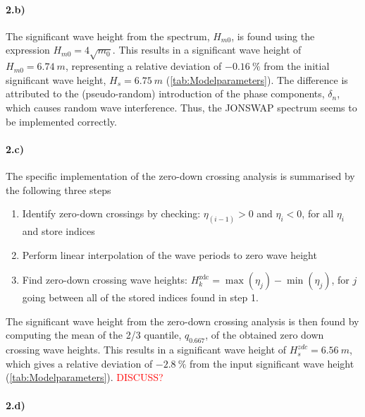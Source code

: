 \paragraph{2.b)} The significant wave height from the spectrum, $H_{m0}$, is found using the expression $H_{m0} = 4\sqrt{m_0}$. This results in a significant wave height of $H_{m0}=\SI{6.74}{m}$, representing a relative deviation of $\SI{-0.16}{\percent}$ from the initial significant wave height, $H_s=\SI{6.75}{m}$ (\cref{tab:Modelparameters}). The difference is attributed to the (pseudo-random) introduction of the phase components, $\delta_n$, which causes random wave interference. Thus, the JONSWAP spectrum seems to be implemented correctly. 

\paragraph{2.c)} The specific implementation of the zero-down crossing analysis is summarised by the following three steps
\begin{enumerate}
    \item Identify zero-down crossings by checking: $\eta_{(i-1)}> 0$ and $\eta_{i} < 0$, for all $\eta_i$ and store indices
    \item Perform linear interpolation of the wave periods to zero wave height
    \item Find zero-down crossing wave heights: $H_k^{\text{zdc}}=\max(\eta_{j})-\min(\eta_{j})$, for $j$ going between all of the stored indices found in step 1.
\end{enumerate}
The significant wave height from the zero-down crossing analysis is then found by computing the mean of the 2/3 quantile, $q_{0.667}$, of the obtained zero down crossing wave heights. This results in a significant wave height of $H_s^{zdc}=\SI{6.56}{m}$, which gives a relative deviation of $\SI{-2.8}{\percent}$ from the input significant wave height (\cref{tab:Modelparameters}). \textcolor{red}{DISCUSS?}

\paragraph{2.d)}

